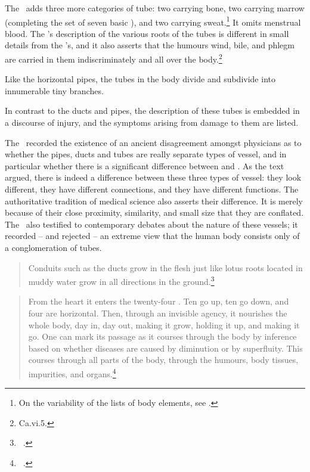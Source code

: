 The \CS\ adds three more categories of tube: two carrying bone, two
carrying marrow (completing the set of seven basic ), and two carrying sweat.\footnote{On the variability of the
    lists of body elements, see \cite[\S4 et passim]{maas-2008}.} It omits
    menstrual blood. The \CS's description of the various roots of the
    tubes is different in small details from the \SS's, and it also
    asserts that the humours wind, bile, and phlegm are carried in them
    indiscriminately and all over the body.\footnote{Ca.vi.5.}

Like the horizontal pipes, the tubes in the body divide and
subdivide into innumerable tiny branches.

In contrast to the ducts and pipes, the description of these tubes is
embedded in a discourse of injury, and the symptoms arising from
damage to them are listed.

The \SS\ recorded the existence of an ancient disagreement amongst
physicians as to whether the pipes, ducts and tubes are really
separate types of vessel, and in particular whether there is a
significant difference between  and
. As the text argued, there is indeed a difference
between these three types of vessel: they look different, they have
different connections, and they have different functions.  The authoritative
tradition of medical science also asserts their difference.  It is
merely because of their close proximity, similarity, and small size
that they are conflated.  The \CS\ also testified to contemporary
debates about the nature of these vessels; it recorded -- and
rejected -- an extreme view that the human body consists only of a
conglomeration of tubes.
\begin{quote}
    Conduits such as the ducts grow in the flesh just like lotus roots
located in muddy water grow in all directions in the
ground.\footnote{\SS\ .}
\end{quote}

\begin{quote}
    From the heart it enters the twenty-four . Ten
go up, ten go down, and four are horizontal.  Then, through an
invisible agency, it nourishes the whole body, day in, day out,
making it grow, holding it up, and making it go.  One can mark its
passage as it courses through the body by inference based on
whether diseases are caused by diminution or by superfluity.  This
 courses through all parts of the body,
through the humours, body tissues, impurities, and
organs.\footnote{\SS\ .}
\end{quote}


